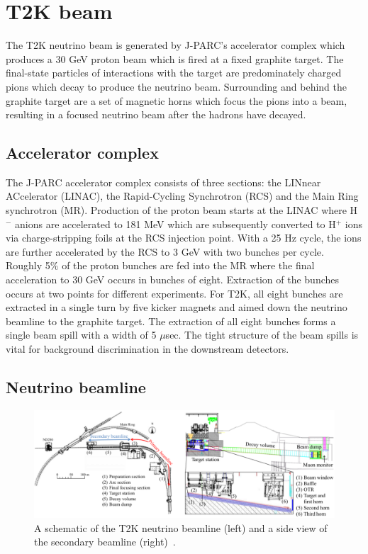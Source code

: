 \section{T2K beam}
\label{sec:T2KBeam}
The T2K neutrino beam is generated by J-PARC's accelerator complex which produces a 30 GeV proton beam which is fired at a fixed graphite target.  The final-state particles of interactions with the target are predominately charged pions which decay to produce the neutrino beam.  Surrounding and behind the graphite target are a set of magnetic horns which focus the pions into a beam, resulting in a focused neutrino beam after the hadrons have decayed.

\subsection{Accelerator complex}
\label{subsec:AcceleratorComplex}
The J-PARC accelerator complex consists of three sections: the LINnear ACcelerator (LINAC), the Rapid-Cycling Synchrotron (RCS) and the Main Ring synchrotron (MR).  Production of the proton beam starts at the LINAC where H$^-$ anions are accelerated to 181 MeV which are subsequently converted to H$^+$ ions via charge-stripping foils at the RCS injection point.  With a 25 Hz cycle, the ions are further accelerated by the RCS to 3 GeV with two bunches per cycle.  Roughly 5$\%$ of the proton bunches are fed into the MR where the final acceleration to 30 GeV occurs in bunches of eight.  Extraction of the bunches occurs at two points for different experiments.  For T2K, all eight bunches are extracted in a single turn by five kicker magnets and aimed down the neutrino beamline to the graphite target.  The extraction of all eight bunches forms a single beam spill with a width of 5 $\mu$sec.  The tight structure of the beam spills is vital for background discrimination in the downstream detectors.

\subsection{Neutrino beamline}
\label{subsec:NeutrinoBeamline}

\begin{figure}
  \centering
  \includegraphics[width=15cm]{images/t2k/neutrino_beamline.pdf}
  \caption{A schematic of the T2K neutrino beamline (left) and a side view of the secondary beamline (right)~\cite{Abe2011106}.}
  \label{fig:NeutrinoBeamline}
\end{figure}

